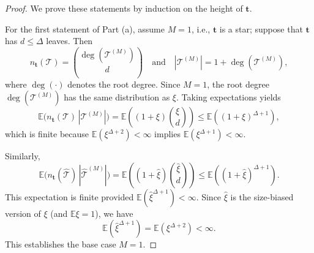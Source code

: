 \documentclass[article]{amsart}
\newcommand{\tc}{\mathcal{T}}
\newcommand{\htc}{\hat{\tc}}
\newcommand{\st}{\textbf{t}}
\newcommand{\n}{n_{\st}}
\newcommand{\E}{\mathbb{E}}
\newcommand{\hxi}{\hat{\xi}}
\theoremstyle{definition}
\theoremstyle{remark}
\begin{document}
\begin{proof}
We prove these statements by induction on the height of $\st$.

For the first statement of Part (a), assume $M=1$, i.e., $\st$ is a star; suppose that $\st$ has $d\leq \Delta$ leaves. Then
\[
\n(\tc)=\binom{\deg(\tc^{(M)})}{d}
\quad\text{and}\quad
|\tc^{(M)}|=1+\deg(\tc^{(M)}),
\]
where $\deg(\cdot)$ denotes the root degree. Since $M=1$, the root degree $\deg(\tc^{(M)})$ has the same distribution as $\xi$. Taking expectations yields
\[
\mathbb{E}\bigl(\n(\tc)\,|\tc^{(M)}|\bigr)
= \E\!\left((1+\xi)\binom{\xi}{d}\right)
\le \E\!\left((1+\xi)^{\Delta+1}\right),
\]
which is finite because $\E(\xi^{\Delta+2})<\infty$ implies $\E(\xi^{\Delta+1})<\infty$.

Similarly,
\[
\mathbb{E}\bigl(\n(\htc)\,|\htc^{(M)}|\bigr)
= \E\!\left((1+\hxi)\binom{\hxi}d\right)
\le \E\!\left((1+\hxi)^{\Delta+1}\right).
\]
This expectation is finite provided $\E(\hxi^{\Delta+1})<\infty$. Since $\hxi$ is the size-biased version of $\xi$ (and $\E\xi=1$), we have
\[
\E(\hxi^{\Delta+1})=\E(\xi^{\Delta+2})<\infty.
\]
This establishes the base case $M=1$.


\end{proof}
\end{document}
